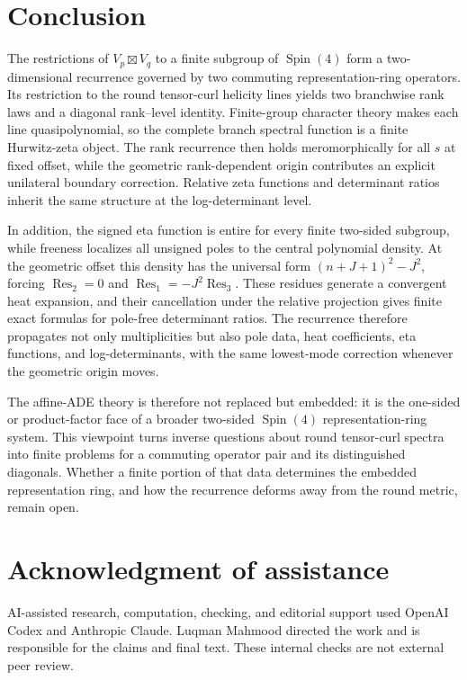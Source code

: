 \documentclass[11pt]{article}
\theoremstyle{definition}
\DeclareMathOperator{\Res}{Res}
\begin{document}
\section{Conclusion}

The restrictions of $V_p\boxtimes V_q$ to a finite subgroup of
$\operatorname{Spin}(4)$ form a two-dimensional recurrence governed by
two commuting representation-ring operators.  Its restriction to the
round tensor-curl helicity lines yields two branchwise rank laws and a
diagonal rank--level identity.  Finite-group character theory makes
each line quasipolynomial, so the complete branch spectral function is
a finite Hurwitz-zeta object.  The rank recurrence then holds
meromorphically for all $s$ at fixed offset, while the geometric
rank-dependent origin contributes an explicit unilateral boundary
correction.  Relative zeta functions and determinant ratios inherit the
same structure at the log-determinant level.

In addition, the signed eta function is entire for every finite
two-sided subgroup, while freeness localizes all unsigned poles to the
central polynomial density.  At the geometric offset this density has
the universal form $(n+J+1)^2-J^2$, forcing
$\Res_2=0$ and $\Res_1=-J^2\Res_3$.  These residues generate a
convergent heat expansion, and their cancellation under the relative
projection gives finite exact formulas for pole-free determinant
ratios.  The recurrence therefore propagates not only multiplicities
but also pole data, heat coefficients, eta functions, and
log-determinants, with the same lowest-mode correction whenever the
geometric origin moves.

The affine-ADE theory is therefore not replaced but embedded: it is the
one-sided or product-factor face of a broader two-sided
$\operatorname{Spin}(4)$ representation-ring system.  This viewpoint
turns inverse questions about round tensor-curl spectra into finite problems
for a commuting operator pair and its distinguished diagonals.  Whether a
finite portion of that data determines the embedded representation ring,
and how the recurrence deforms away from the round metric, remain open.

\enlargethispage{\baselineskip}
\section*{Acknowledgment of assistance}
AI-assisted research, computation, checking, and editorial support used
OpenAI Codex and Anthropic Claude. Luqman Mahmood directed the work
and is responsible for the claims and final text. These internal
checks are not external peer review.



\end{document}
